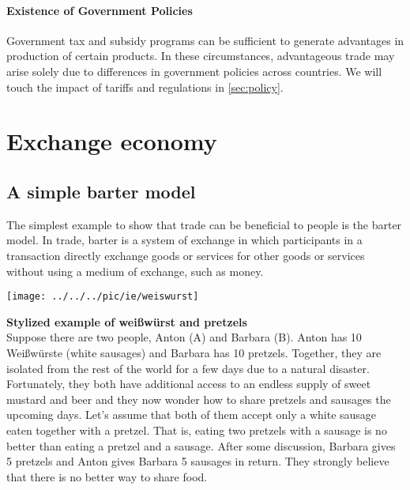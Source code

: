 	\paragraph{Existence of Government Policies}
	Government tax and subsidy programs can be sufficient to generate advantages in production of certain products. In these circumstances, advantageous trade may arise solely due to differences in government policies across countries. We will touch the impact of tariffs and regulations in \autoref{sec:policy}.
	
	
	
	
	
	
	\pbn
	\section{Exchange economy}\label{sec:exchange-economy}
	
	
	\subsection{A simple barter model}
	
	The simplest example to show that trade can be beneficial to people is the barter model. In trade, barter is a system of exchange in which participants in a transaction directly exchange goods or services for other goods or services without using a medium of exchange, such as money. 
	
	
	\begin{minipage}{0.4\linewidth}	\begin{center}
			\texttt{[image: ../../../pic/ie/weiswurst]}
		\end{center}
	\end{minipage}
	\begin{minipage}{0.6\linewidth}	\textbf{Stylized example of weißwürst and pretzels}\\
		Suppose there are two people, Anton (A) and Barbara (B). Anton has 10 Weißwürste (white sausages) and Barbara has 10 pretzels. Together, they are isolated from the rest of the world for a few days due to a natural disaster. Fortunately, they both have additional access to an endless supply of sweet mustard and beer and they now wonder how to share pretzels and sausages the upcoming days. Let's assume that both of them accept only a white sausage eaten together with a pretzel. That is, eating two pretzels with a sausage is no better than eating a pretzel and a sausage. After some discussion, Barbara gives 5 pretzels and Anton gives Barbara 5 sausages in return. They strongly believe that there is no better way to share food.
	\end{minipage}
	
